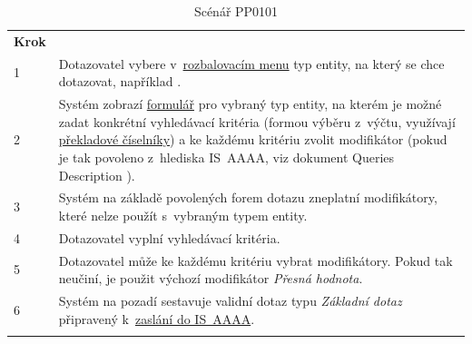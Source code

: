 \documentclass[thesis=M,czech]{FITthesis}[2019/12/23]
\begin{document}
	\begin{longtable}{|p{}|p{}|}
		\rowcolor{Gray}\multicolumn{2}{|l|}{\textbf{Základní scénář}} \\ \hline
		\textbf{Krok} & \\ \hline
		1 & Dotazovatel vybere v~\hyperref[RozbalovaciMenu]{rozbalovacím menu} typ entity, na který se chce dotazovat, například \uv{Osoba}. \\ \hline
		2 & Systém zobrazí \hyperref[O02Dotaz]{formulář} pro vybraný typ entity, na kterém je možné zadat konkrétní vyhledávací kritéria (formou výběru z~výčtu, využívají \hyperref[PrekladoveCiselniky]{překladové číselníky}) a ke každému kritériu zvolit modifikátor (pokud je tak povoleno z~hlediska IS~AAAA, viz dokument Queries Description \cite{Queries}).  \\ \hline
		3 & Systém na základě povolených forem dotazu zneplatní modifikátory, které nelze použít s~vybraným typem entity. \\ \hline
		4 & Dotazovatel vyplní vyhledávací kritéria. \\ \hline
		5 & Dotazovatel může ke každému kritériu vybrat modifikátory. Pokud tak neučiní, je použit výchozí modifikátor \textit{Přesná hodnota}. \\ \hline
		6 & Systém na pozadí sestavuje validní dotaz typu \textit{Základní dotaz} připravený k~\hyperref[ZaslaniDoISAAA]{zaslání do IS~AAAA}. \\ \hline
		\caption{Scénář PP0101}
		\label{tab:Scénář PP0101}
	\end{longtable}

\newpage
\end{document}
